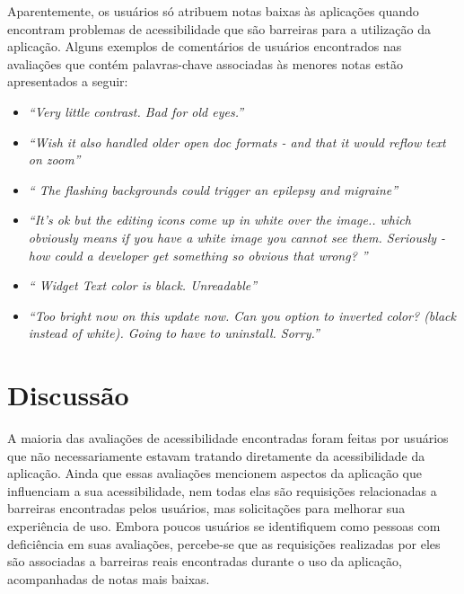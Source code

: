 Aparentemente, os usuários só atribuem notas baixas às aplicações quando encontram problemas de acessibilidade que são barreiras para a utilização da aplicação. 
Alguns exemplos de comentários de usuários encontrados nas avaliações que contém palavras-chave associadas às menores notas estão apresentados a seguir:
\begin{itemize}
 \item \textit{``Very little contrast. Bad for old eyes.''}
 \item \textit{``Wish it also handled older open doc formats - and that it would reflow text on zoom''}
 \item \textit{`` The flashing backgrounds could trigger an epilepsy and migraine''}
 \item \textit{``It's ok but the editing icons come up in white over the image.. which obviously means if you have a white image you cannot see them. Seriously - how could a developer get something so obvious that wrong? ''}
 \item \textit{`` Widget Text color is black. Unreadable''}
 \item \textit{``Too bright now on this update now. Can you option to inverted color? (black instead of white). Going to have to uninstall. Sorry.''}  
\end{itemize}



\section{Discussão}

A maioria das avaliações de acessibilidade encontradas foram feitas por usuários que não necessariamente estavam tratando diretamente da acessibilidade da aplicação. Ainda que essas avaliações mencionem aspectos da aplicação que influenciam a sua acessibilidade, nem todas elas são requisições relacionadas a barreiras encontradas pelos usuários, mas solicitações para melhorar sua experiência de uso. 
Embora poucos usuários se identifiquem como pessoas com deficiência em suas avaliações, percebe-se que as requisições realizadas por eles são associadas a barreiras reais encontradas durante o uso da aplicação, acompanhadas de notas mais baixas. 


